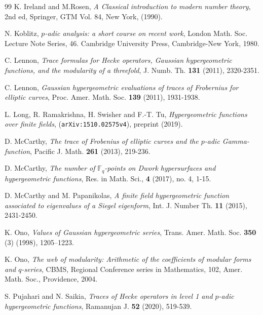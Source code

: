 \documentclass[12pt]{amsart}
\theoremstyle{plain}
\theoremstyle{definition}
\theoremstyle{remark}
\newcommand{\F}{\mathbb{F}}
\numberwithin{equation}{section}
\begin{document}
\begin{thebibliography}{99}
		K. Ireland and M.Rosen, {\it A Classical introduction to modern number theory}, 2nd ed,  Springer,  GTM Vol. 84, New York, (1990).
		
		
		
		 N. Koblitz, {\it $p$-adic analysis: a short course on recent work}, London Math. Soc. Lecture
                                                                            Note Series, 46. Cambridge University Press, Cambridge-New York, 1980.

		
		
		
		 C. Lennon, \emph{Trace formulas for Hecke operators, Gaussian hypergeometric functions, and the modularity of a threefold}, J. Numb. Th. \textbf{131} (2011), 2320-2351.
		
		 C. Lennon, \emph{Gaussian hypergeometric evaluations of traces of Frobernius for elliptic curves},
		Proc. Amer. Math. Soc. \textbf{139} (2011), 1931-1938.
		
			
		L. Long, R. Ramakrishna, H. Swisher and F.-T. Tu, \emph{Hypergeometric functions over finite fields}, (\texttt{arXiv:1510.02575v4}),  preprint (2019).
		
		
			
		
		
		 D. McCarthy, \emph{The trace of Frobenius of elliptic curves and the $p$-adic Gamma-function}, Pacific J. Math. \textbf{261} (2013), 219-236.
		
	D. McCarthy, \emph{The number of $\F_q$-points on Dwork hypersurfaces and hypergeometric functions}, Res. in Math. Sci., \textbf{4} (2017), no. 4, 1-15.
		
				
		
		
		 D. McCarthy and M. Papanikolas, \emph{A finite field hypergeometric function associated to eigenvalues of a Siegel eigenform}, Int. J. Number Th. \textbf{11} (2015), 2431-2450.
		
			
		
		
		
		K. Ono, {\it Values of Gaussian hypergeometric series}, Trans. Amer. Math. Soc. {\bf 350} (3) (1998), 1205--1223.
		
		K. Ono, {\it The web of modularity: Arithmetic of the coefficients of modular forms and $q$-series}, CBMS, Regional Conference series in Mathematics, 102, Amer. Math. Soc., Providence, 2004.
		
			
 S. Pujahari and N. Saikia, \emph{Traces of Hecke operators in level 1 and $p$-adic hypergeometric functions}, Ramanujan J. \textbf{52} (2020), 519-539.


\end{thebibliography}
\end{document}
